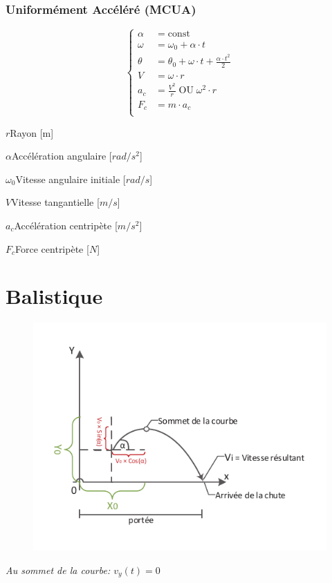 \documentclass[12pt,a4paper]{article} %
\newcommand\const{\mathrm{const}}
\begin{document}
\subsubsection*{Uniformément Accéléré (MCUA)}
\begin{twocols}
	\[
	\left\{
		\begin{aligned}
			\alpha &= \const \\
			\omega &= \omega_0 + \alpha \cdot t \\
			\theta &= \theta_0 + \omega \cdot t + \frac{\alpha \cdot t^2}{2} \\
			V &= \omega \cdot r \\
			a_c &= \frac{V^2}{r}\;\text{OU}\;\omega^2 \cdot r \\
			F_c &= m \cdot a_c \\
		\end{aligned}
	\right.
	\]
\nextcol
	\begin{vardef}
		\item{$r$}{Rayon [m]}
		\item{$\alpha$}{Accélération angulaire [$rad/s^2$]}
		\item{$\omega_0$}{Vitesse angulaire initiale [$rad/s$]}
		\item{$V$}{Vitesse tangantielle [$m/s$]}
		\item{$a_c$}{Accélération centripète [$m/s^2$]}
		\item{$F_c$}{Force centripète [$N$]}
	\end{vardef}
\end{twocols}

\newpage

\section{Balistique}

\begin{figure}[h]
	\centering
	\includegraphics{Balistique}
\end{figure}
\emph{Au sommet de la courbe: $v_y(t) = 0$}
\end{document}
